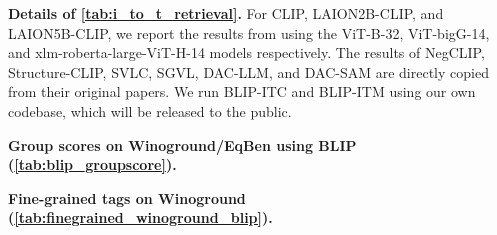\documentclass{article} \usepackage{iclr2024_conference,times}
\begin{document}
{\bf Details of \autoref{tab:i_to_t_retrieval}.} For CLIP, LAION2B-CLIP, and LAION5B-CLIP, we report the results from \citet{sugarcrepe} using the ViT-B-32, ViT-bigG-14, and xlm-roberta-large-ViT-H-14 models respectively. The results of NegCLIP, Structure-CLIP, SVLC, SGVL, DAC-LLM, and DAC-SAM are directly copied from their original papers. We run BLIP-ITC and BLIP-ITM using our own codebase, which will be released to the public.

{\bf Group scores on Winoground/EqBen using BLIP (\autoref{tab:blip_groupscore}).} 

\begin{table}[h]
\centering
{}
\caption{\small Performance comparison of BLIP's ITCScore, ITMScore, and $\alpha$-tuned VisualGPTScore$^{\alpha^{\ast}}$ on Winoground (all) and EqBen (val). }
\label{tab:blip_groupscore}
\end{table}

{\bf Fine-grained tags on Winoground (\autoref{tab:finegrained_winoground_blip}).} 
\end{document}
